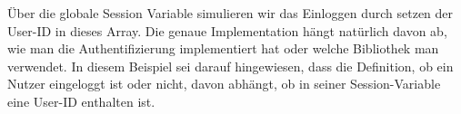 %                                                                                                                                                                    
%                                                                                                                                                                    
%                                                                                                                                                                    
\begin{ruby}[label=test/functional/job\_controller\_test.rb]
  
    
  \PY{o}{[}\PY{o}{]}  
  
      

   
\end{ruby}

\tddred
Über die globale Session Variable simulieren wir das Einloggen durch setzen der User-ID in dieses Array. Die genaue Implementation hängt natürlich davon ab, wie man die Authentifizierung implementiert hat oder welche Bibliothek man verwendet. In diesem Beispiel sei darauf hingewiesen, dass die Definition, ob ein Nutzer eingeloggt ist oder nicht, davon abhängt, ob in seiner Session-Variable eine User-ID enthalten ist.

